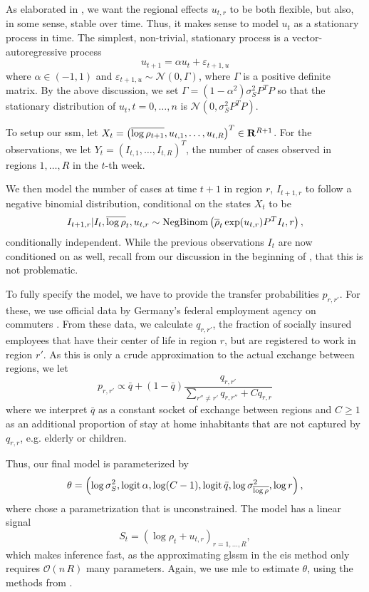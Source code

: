 As elaborated in , we want the regional effects $u_{t,r}$ to be both flexible, but also, in some sense, stable over time. Thus, it makes sense to model $u_{t}$ as a stationary process in time. The simplest, non-trivial, stationary process is a vector-autoregressive process 
$$
    u_{t + 1} = \alpha u_{t} + \varepsilon_{t + 1, u}
$$
where $\alpha \in (-1, 1)$ and $\varepsilon_{t + 1,u} \sim \mathcal N(0, \Gamma)$, where $\Gamma$ is a positive definite matrix. By the above discussion, we set $\Gamma = (1-\alpha^{2}) \sigma^{2}_{S}P^{T}P$ so that the stationary distribution of $u_{t}, t = 0, \dots, n$  is $\mathcal N(0, \sigma^{2}_SP^{T}P)$. 

To setup our \acrshort{ssm}, let $X_{t} = \left( \overline{\log \rho_{t + 1}}, u_{t, 1}, \dots, u_{t, R} \right)^{T} \in \mathbf R^{R + 1}$. For the observations, we let $Y_{t} = \left( I_{t, 1}, \dots, I_{t, R} \right)^{T}$, the number of cases observed in regions $1, \dots, R$ in the $t$-th week. 

We then model the number of cases at time $t + 1$ in region $r$, $I_{t+1, r}$ to follow a negative binomial distribution, conditional on the states $X_{t}$ to be
$$
    I_{t+1,r} | I_{t}, \overline{\log\rho}_{t}, u_{t,r} \sim \operatorname{NegBinom} \left( \overline{\rho}_{t}\exp(u_{t,r})P^{T}I_t, r\right),
$$
conditionally independent. While the previous observations $I_{t}$ are now conditioned on as well, recall from our discussion in the beginning of , that this is not problematic.

To fully specify the model, we have to provide the transfer probabilities $p_{r,r'}$. For these, we use official data by Germany's federal employment agency on commuters . From these data, we calculate $q_{r,r'}$, the fraction of socially insured employees that have their center of life in region $r$, but are registered to work in region $r'$. As this is only a crude approximation to the actual exchange between regions, we let 
$$
    p_{r,r'} \propto \bar q + (1- \bar q) \frac{q_{r,r'}}{\sum_{r'' \neq r'} q_{r,r''} + C q_{r,r}}
$$
where we interpret $\bar q$ as a constant socket of exchange between regions and $C \geq 1$ as an additional proportion of stay at home inhabitants that are not captured by $q_{r,r}$, e.g. elderly or children. 

Thus, our final model is parameterized by
$$
    \theta = \left( \log \sigma^{2}_S, \operatorname{logit} \alpha, \log (C - 1), \operatorname{logit} \bar q, \log \sigma^{2}_{\overline{\log \rho}}, \log r\right),
$$
where chose a parametrization that is unconstrained. The model has a linear signal 
$$
    S_{t} = \left(\log \rho_{t} + u_{t,r}\right)_{r = 1, \dots, R},
$$
which makes inference fast, as the approximating \acrshort{glssm} in the \acrshort{eis} method only requires $\mathcal O(n\,R)$ many parameters. Again, we use \acrshort{mle} to estimate $\theta$, using the methods from .

